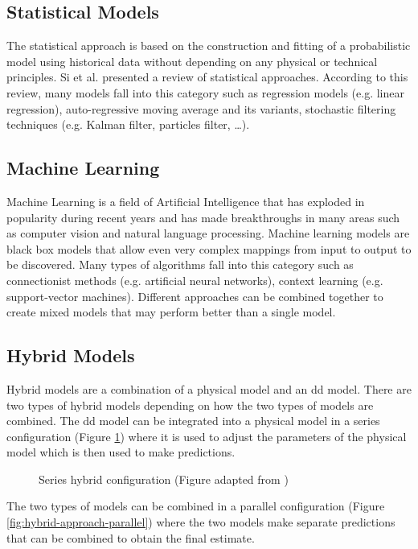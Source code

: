 \subsection{Statistical Models}
The statistical approach is based on the construction and fitting of a probabilistic model using historical data without depending on any physical or technical principles. 
Si et al. \cite{Si2011} presented a review of statistical approaches. According to this review, many models fall into this category such as regression models (e.g. linear regression), auto-regressive moving average and its variants, stochastic filtering techniques (e.g. Kalman filter, particles filter, …).

\subsection{Machine Learning}
Machine Learning is a field of Artificial Intelligence that has exploded in popularity during recent years and has made breakthroughs in many areas such as computer vision and natural language processing. Machine learning models are black box models that allow even very complex mappings from input to output to be discovered. Many types of algorithms fall into this category such as connectionist methods (e.g. artificial neural networks), context learning (e.g. support-vector machines). Different approaches can be combined together to create mixed models that may perform better than a single model.

\subsection{Hybrid Models}
Hybrid models are a combination of a physical model and an \acrlong{dd} model. There are two types of hybrid models depending on how the two types of models are combined. The \acrlong{dd} model can be integrated into a physical model in a series configuration (Figure \ref{fig:hybrid-approach-series}) where it is used to adjust the parameters of the physical model which is then used to make predictions.

\begin{figure}[H]
    \centering
    
    \caption{Series hybrid configuration (Figure adapted from \cite{Mangili2013})}
    \label{fig:hybrid-approach-series}
\end{figure}

The two types of models can be combined in a parallel configuration (Figure \ref{fig:hybrid-approach-parallel}) where the two models make separate predictions that can be combined to obtain the final estimate.


